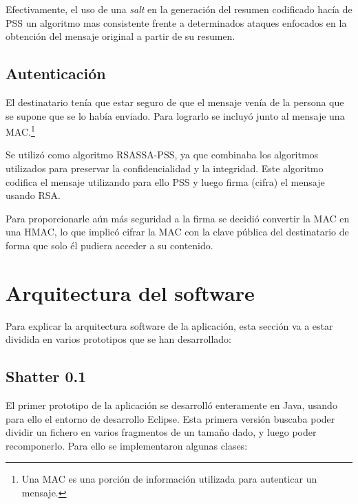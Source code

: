 Efectivamente, el uso de una \emph{salt} en la generación del resumen
codificado hacía de PSS un algoritmo mas consistente frente a determinados
ataques enfocados en la obtención del mensaje original a partir de su resumen.

\subsection{Autenticación}

El destinatario tenía que estar seguro de que el mensaje venía de la persona
que se supone que se lo había enviado. Para lograrlo se incluyó junto al mensaje
una MAC.\footnote{Una MAC es una porción de información utilizada para
autenticar un mensaje.}

Se utilizó como algoritmo RSASSA-PSS, ya que combinaba los algoritmos utilizados
para preservar la confidencialidad y la integridad. Este algoritmo codifica el
mensaje utilizando para ello PSS y luego firma (cifra) el mensaje usando RSA.

Para proporcionarle aún más seguridad a la firma se decidió convertir la MAC en
una HMAC, lo que implicó cifrar la MAC con la clave pública del destinatario de
forma que solo él pudiera acceder a su contenido.


\section{Arquitectura del software}

Para explicar la arquitectura software de la aplicación, esta sección va a estar dividida en varios
prototipos que se han desarrollado:

\subsection{Shatter 0.1}

El primer prototipo de la aplicación se desarrolló enteramente en Java, usando para ello el entorno
de desarrollo Eclipse. Esta primera versión buscaba poder dividir un fichero en varios fragmentos
de un tamaño dado, y luego poder recomponerlo. Para ello se implementaron algunas clases:

